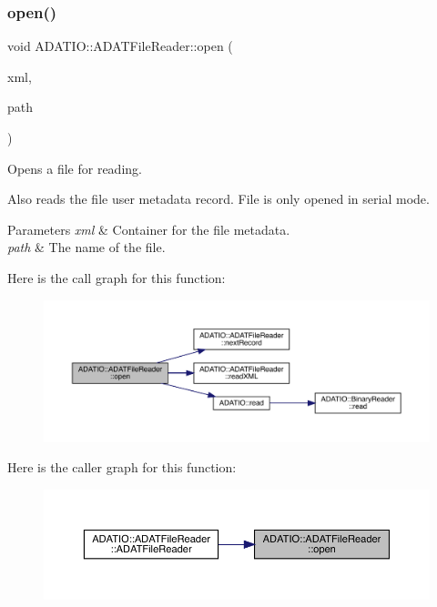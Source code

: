 \subsubsection{\texorpdfstring{open()}{open()}}
{\footnotesize\ttfamily void A\+D\+A\+T\+I\+O\+::\+A\+D\+A\+T\+File\+Reader\+::open (\begin{DoxyParamCaption}\item[{\mbox{\hyperlink{classADATXML_1_1XMLReader}{X\+M\+L\+Reader}} \&}]{xml,  }\item[{const std\+::string \&}]{path }\end{DoxyParamCaption})}



Opens a file for reading. 

Also reads the file user metadata record. File is only opened in serial mode. 
\begin{DoxyParams}{Parameters}
{\em xml} & Container for the file metadata. \\
\hline
{\em path} & The name of the file. \\
\hline
\end{DoxyParams}
Here is the call graph for this function\+:
\nopagebreak
\begin{figure}[H]
\begin{center}
\leavevmode
\includegraphics[width=350pt]{db/de5/group__qio_ga2b2ac967129dfd2d61a79e36034b400f_cgraph}
\end{center}
\end{figure}
Here is the caller graph for this function\+:
\nopagebreak
\begin{figure}[H]
\begin{center}
\leavevmode
\includegraphics[width=350pt]{db/de5/group__qio_ga2b2ac967129dfd2d61a79e36034b400f_icgraph}
\end{center}
\end{figure}
\mbox{\label{group__qio_gac92ce1b0fee7c00b8a7dc988f3d4906e}} 
